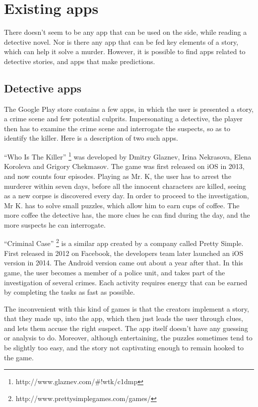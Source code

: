 \documentclass{mproj}
\begin{document}
\section{Existing apps}

There doesn't seem to be any app that can be used on the side, while reading a detective novel. Nor is there any app that can be fed key elements of a story, which can help it solve a murder. However, it is possible to find apps related to detective stories, and apps that make predictions.

\subsection{Detective apps}

The Google Play store contains a few apps, in which the user is presented a story, a crime scene and few potential culprits. Impersonating a detective, the player then has to examine the crime scene and interrogate the suspects, so as to identify the killer. Here is a description of two such apps. \par

``Who Is The Killer'' \footnote{http://www.glaznev.com/\#!wtk/c1dmp} was developed by Dmitry Glaznev, Irina Nekrasova, Elena Koroleva and Grigory Chekmasov. The game was first released on iOS in 2013, and now counts four episodes. Playing as Mr. K, the user has to arrest the murderer within seven days, before all the innocent characters are killed, seeing as a new corpse is discovered every day. In order to proceed to the investigation, Mr K. has to solve small puzzles, which allow him to earn cups of coffee. The more coffee the detective has, the more clues he can find during the day, and the more suspects he can interrogate. \par

``Criminal Case'' \footnote{http://www.prettysimplegames.com/games/} is a similar app created by a company called Pretty Simple. First released in 2012 on Facebook, the developers team later launched an iOS version in 2014. The Android version came out about a year after that. In this game, the user becomes a member of a police unit, and takes part of the investigation of several crimes. Each activity requires energy that can be earned by completing the tasks as fast as possible. \par

The inconvenient with this kind of games is that the creators implement a story, that they made up, into the app, which then just leads the user through clues, and lets them accuse the right suspect. The app itself doesn't have any guessing or analysis to do.
Moreover, although entertaining, the puzzles sometimes tend to be slightly too easy, and the story not captivating enough to remain hooked to the game.
\end{document}
